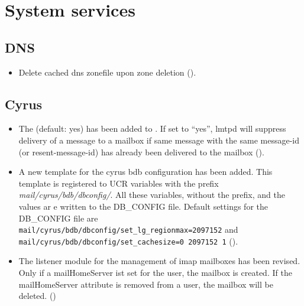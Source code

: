 \section{System services}


\subsection{DNS}
\begin{itemize}
\item Delete cached dns zonefile upon zone deletion ().
\end{itemize}

\subsection{Cyrus}
\begin{itemize}

\item The  (default: yes) has
been added to . If set to ``yes'', lmtpd will
suppress delivery of a message to a mailbox if same message with the same
message-id (or resent-message-id) has already
been delivered to the mailbox ().

\item A new \ucsUCR{} template  for the cyrus
bdb configuration has been added. This template is registered to
UCR variables with the prefix \emph{mail/cyrus/bdb/dbconfig/}. All
these variables, without the prefix, and the values ar e written to the
DB\_CONFIG file. Default settings for the DB\_CONFIG file are
\texttt{mail/cyrus/bdb/dbconfig/set\_lg\_regionmax=2097152} and
\texttt{mail/cyrus/bdb/dbconfig/set\_cachesize=0 2097152 1} ().

\item The listener module for the management of imap mailboxes has been
revised. Only if a mailHomeServer ist set for the user, the mailbox is
created. If the mailHomeServer attribute is removed from a user, the mailbox
will be deleted. ()

\end{itemize}

